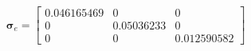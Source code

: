 $$
\boldsymbol\sigma_e = \left[\begin{matrix}0.046165469 & 0 & 0\\0 & 0.05036233 & 0\\0 & 0 & 0.012590582\end{matrix}\right]
$$
